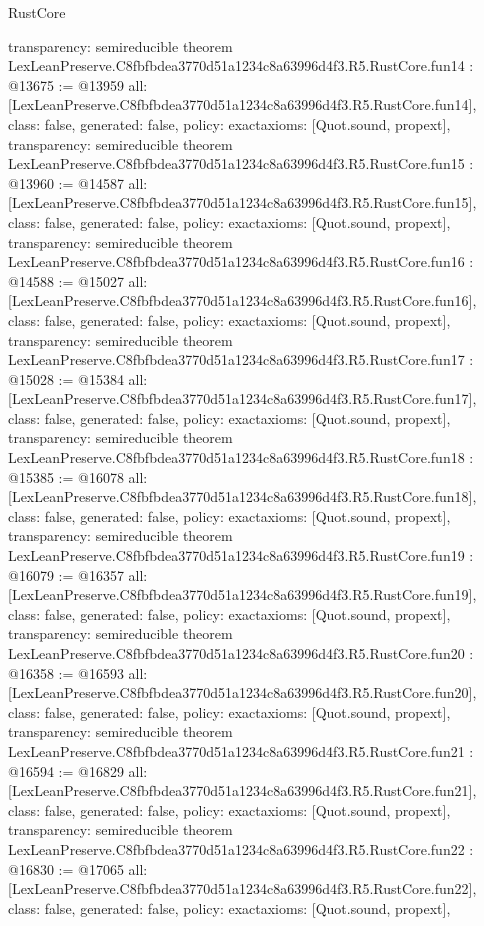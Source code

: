 \begin{lexlean}{RustCore}
\begin{coremodule}
{  transparency: semireducible
}
theorem LexLeanPreserve.C8fbfbdea3770d51a1234c8a63996d4f3.R5.RustCore.fun14 : @13675 := @13959 {
  all: [LexLeanPreserve.C8fbfbdea3770d51a1234c8a63996d4f3.R5.RustCore.fun14],
  class: false,
  generated: false,
  policy: exact{axioms: [Quot.sound, propext]},
  transparency: semireducible
}
theorem LexLeanPreserve.C8fbfbdea3770d51a1234c8a63996d4f3.R5.RustCore.fun15 : @13960 := @14587 {
  all: [LexLeanPreserve.C8fbfbdea3770d51a1234c8a63996d4f3.R5.RustCore.fun15],
  class: false,
  generated: false,
  policy: exact{axioms: [Quot.sound, propext]},
  transparency: semireducible
}
theorem LexLeanPreserve.C8fbfbdea3770d51a1234c8a63996d4f3.R5.RustCore.fun16 : @14588 := @15027 {
  all: [LexLeanPreserve.C8fbfbdea3770d51a1234c8a63996d4f3.R5.RustCore.fun16],
  class: false,
  generated: false,
  policy: exact{axioms: [Quot.sound, propext]},
  transparency: semireducible
}
theorem LexLeanPreserve.C8fbfbdea3770d51a1234c8a63996d4f3.R5.RustCore.fun17 : @15028 := @15384 {
  all: [LexLeanPreserve.C8fbfbdea3770d51a1234c8a63996d4f3.R5.RustCore.fun17],
  class: false,
  generated: false,
  policy: exact{axioms: [Quot.sound, propext]},
  transparency: semireducible
}
theorem LexLeanPreserve.C8fbfbdea3770d51a1234c8a63996d4f3.R5.RustCore.fun18 : @15385 := @16078 {
  all: [LexLeanPreserve.C8fbfbdea3770d51a1234c8a63996d4f3.R5.RustCore.fun18],
  class: false,
  generated: false,
  policy: exact{axioms: [Quot.sound, propext]},
  transparency: semireducible
}
theorem LexLeanPreserve.C8fbfbdea3770d51a1234c8a63996d4f3.R5.RustCore.fun19 : @16079 := @16357 {
  all: [LexLeanPreserve.C8fbfbdea3770d51a1234c8a63996d4f3.R5.RustCore.fun19],
  class: false,
  generated: false,
  policy: exact{axioms: [Quot.sound, propext]},
  transparency: semireducible
}
theorem LexLeanPreserve.C8fbfbdea3770d51a1234c8a63996d4f3.R5.RustCore.fun20 : @16358 := @16593 {
  all: [LexLeanPreserve.C8fbfbdea3770d51a1234c8a63996d4f3.R5.RustCore.fun20],
  class: false,
  generated: false,
  policy: exact{axioms: [Quot.sound, propext]},
  transparency: semireducible
}
theorem LexLeanPreserve.C8fbfbdea3770d51a1234c8a63996d4f3.R5.RustCore.fun21 : @16594 := @16829 {
  all: [LexLeanPreserve.C8fbfbdea3770d51a1234c8a63996d4f3.R5.RustCore.fun21],
  class: false,
  generated: false,
  policy: exact{axioms: [Quot.sound, propext]},
  transparency: semireducible
}
theorem LexLeanPreserve.C8fbfbdea3770d51a1234c8a63996d4f3.R5.RustCore.fun22 : @16830 := @17065 {
  all: [LexLeanPreserve.C8fbfbdea3770d51a1234c8a63996d4f3.R5.RustCore.fun22],
  class: false,
  generated: false,
  policy: exact{axioms: [Quot.sound, propext]},
}
\end{coremodule}
\end{lexlean}
